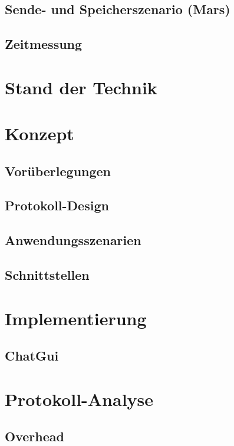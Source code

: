 \documentclass[
    11pt, %
    DIV=11,
    ngerman, %
    a4paper, %
    twoside, %
    titlepage, %
    parskip=half, %
    headings=normal, %
    listof=totoc, %
    bibliography=totoc, %
    index=totoc, %
    captions=tableheading, %
    final %
]{scrreprt}
\begin{document}
	\section{Sende- und Speicherszenario (Mars)}
		
	\section{Zeitmessung}
		

\chapter{Stand der Technik}
  

\chapter{Konzept}
	
	\section{Vor{\"u}berlegungen}
		
	\newpage
	\section{Protokoll-Design}
		
	\section{Anwendungsszenarien}
		
	\section{Schnittstellen}
		

\chapter{Implementierung}
	
	\section{ChatGui}
		

\chapter{Protokoll-Analyse}
	
	\section{Overhead}
		
\end{document}
